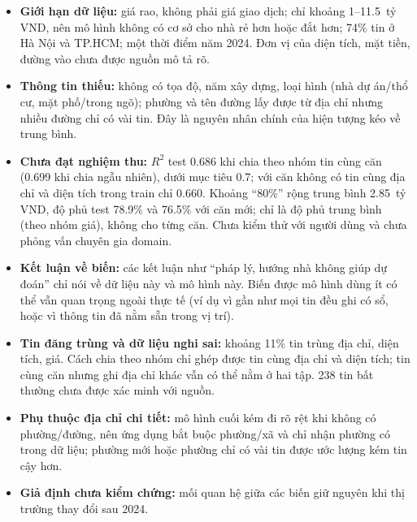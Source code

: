 \documentclass[11pt]{article}
\newcommand{\ty}{tỷ VND}
\begin{document}
\begin{itemize}
    \item \textbf{Giới hạn dữ liệu:} giá rao, không phải giá giao dịch; chỉ khoảng 1--11.5~\ty, nên mô hình
          không có cơ sở cho nhà rẻ hơn hoặc đắt hơn; 74\% tin ở Hà Nội và TP.HCM; một thời điểm năm 2024.
          Đơn vị của diện tích, mặt tiền, đường vào chưa được nguồn mô tả rõ.
    \item \textbf{Thông tin thiếu:} không có tọa độ, năm xây dựng, loại hình (nhà dự án/thổ cư, mặt phố/trong ngõ);
          phường và tên đường lấy được từ địa chỉ nhưng nhiều đường chỉ có vài tin. Đây là nguyên nhân chính của
          hiện tượng kéo về trung bình.
    \item \textbf{Chưa đạt nghiệm thu:} $R^2$ test 0.686 khi chia theo nhóm tin cùng căn (0.699 khi chia ngẫu
          nhiên), dưới mục tiêu 0.7; với căn không có tin cùng địa chỉ và diện tích trong train chỉ 0.660. Khoảng
          ``80\%'' rộng trung bình 2.85~\ty{}, độ phủ test 78.9\% và 76.5\% với căn mới; chỉ là độ phủ trung bình (theo
          nhóm giá), không cho từng căn. Chưa kiểm thử với người dùng và chưa phỏng vấn chuyên gia domain.
    \item \textbf{Kết luận về biến:} các kết luận như ``pháp lý, hướng nhà không giúp dự đoán'' chỉ nói về dữ liệu
          này và mô hình này. Biến được mô hình dùng ít có thể vẫn quan trọng ngoài thực tế (ví dụ vì gần như mọi tin
          đều ghi có sổ, hoặc vì thông tin đã nằm sẵn trong vị trí).
    \item \textbf{Tin đăng trùng và dữ liệu nghi sai:} khoảng 11\% tin trùng địa chỉ, diện tích, giá. Cách chia theo
          nhóm chỉ ghép được tin cùng địa chỉ và diện tích; tin cùng căn nhưng ghi địa chỉ khác vẫn có thể nằm ở hai
          tập. 238 tin bất thường chưa được xác minh với nguồn.
    \item \textbf{Phụ thuộc địa chỉ chi tiết:} mô hình cuối kém đi rõ rệt khi không có phường/đường, nên ứng dụng bắt
          buộc phường/xã và chỉ nhận phường có trong dữ liệu; phường mới hoặc phường chỉ có vài tin được ước lượng kém tin
          cậy hơn.
    \item \textbf{Giả định chưa kiểm chứng:} mối quan hệ giữa các biến giữ nguyên khi thị trường thay đổi sau 2024.
\end{itemize}
\end{document}

